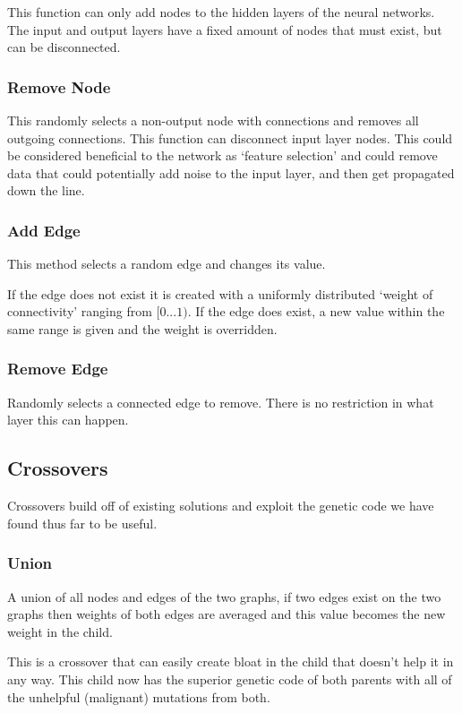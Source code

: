 \documentclass[journal]{IEEEtran}
\begin{document}
      This function can only add nodes to the hidden layers of the neural networks. The input and
       output layers have a fixed amount of nodes that must exist, but can be disconnected.

    \subsubsection{Remove Node}
      This randomly selects a non-output node with connections and removes all outgoing
      connections. This function can disconnect input layer nodes. This could be considered
      beneficial to the network as `feature selection' and could remove data that could
      potentially add noise to the input layer, and then get propagated down the line.

    \subsubsection{Add Edge}
      This method selects a random edge and changes its value.

      If the edge does not exist it is created with a uniformly distributed `weight of connectivity'
      ranging from $ [0...1) $.
      If the edge does exist, a new value within the same range is given and the weight is overridden.

    \subsubsection{Remove Edge}
      Randomly selects a connected edge to remove. There is no restriction in what layer this can happen.
  \subsection{Crossovers}
  Crossovers build off of existing solutions and exploit the genetic code we have found thus far to be useful.
    \subsubsection{Union}
    A union of all nodes and edges of the two graphs, if two edges exist on the two graphs then
    weights of both edges are averaged and this value becomes the new weight in the child.

    This is a crossover that can easily create bloat in the child that doesn't help it in any way.
    This child now has the superior genetic code of both parents with all of the unhelpful (malignant)
    mutations from both. \cite{lachlan} %
\end{document}
